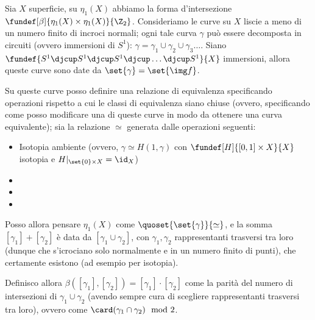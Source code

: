 

\newcommand*\tc{\ \text{t.c.} \ } %
\newcommand*\dual{{^\ast}} %
\newcommand*\base[1][B]{\mathcal{#1}} %



Sia $X$ superficie, su $\eta_1(X)$ abbiamo la forma d'intersezione $\fundef[\beta]{\eta_1(X) \times \eta_1(X)}{\Z_2}$. Consideriamo le curve su $X$ liscie a meno di un numero finito di incroci normali; ogni tale curva $\gamma$ può essere decomposta in circuiti (ovvero immersioni di $S^1$): $\gamma = \gamma_1 \cup \gamma_2 \cup \gamma_3 \dots$.
Siano $\fundef{S^1 \djcup S^1 \djcup S^1 \djcup \dots \djcup S^1}{X}$ immersioni, allora queste curve sono date da $\set{\gamma} = \set{\img f}$.

Su queste curve posso definire una relazione di equivalenza specificando operazioni rispetto a cui le classi di equivalenza siano chiuse (ovvero, specificando come posso modificare una di queste curve in modo da ottenere una curva equivalente); sia la relazione $\simeq$ generata dalle operazioni seguenti:
\begin{itemize}
	\item Isotopia ambiente (ovvero, $\gamma \simeq H(1, \gamma)$ con $\fundef[H]{[0,1] \times X}{X}$ isotopia e $H |_{ \set{0} \times X} = \id_X$)
	\newcommand*\INPUTIMAGE[1]{%
		\def\svgwidth{7cm} %
		\item \raisebox{-0.5\height+1ex}{} %
	}
	\INPUTIMAGE{figura36.pdf_tex}
	\INPUTIMAGE{figura37.pdf_tex}
	\INPUTIMAGE{figura38.pdf_tex}
\end{itemize}
Posso allora pensare $\eta_1(X)$ come $\quoset{ \set{\gamma} }{\simeq} $, e la somma $[\gamma_1] + [\gamma_2]$ è data da $[\gamma_1 \cup \gamma_2]$, con $\gamma_1, \gamma_2$ rappresentanti trasversi tra loro (dunque che s'icrociano solo normalmente e in un numero finito di punti), che certamente esistono (ad esempio per isotopia).

Definisco allora $\beta([\gamma_1], [\gamma_2]) = [\gamma_1] \cdot [\gamma_2]$ come la parità del numero di intersezioni di $\gamma_1 \cup \gamma_2$ (avendo sempre cura di scegliere rappresentanti trasversi tra loro), ovvero come $\card(\gamma_1\cap\gamma_2) \mod 2$.

